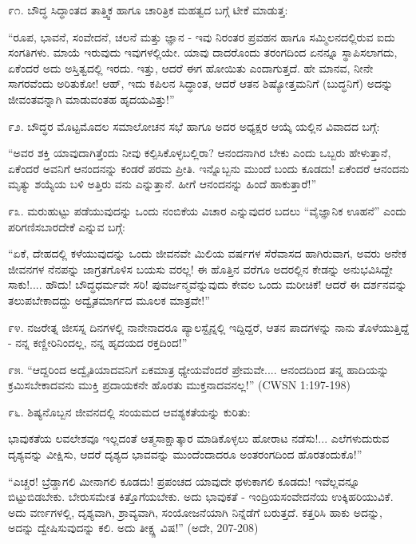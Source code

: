 ೯೧. ಬೌದ್ಧ ಸಿದ್ಧಾಂತದ ತಾತ್ತ್ವಿಕ ಹಾಗೂ ಚಾರಿತ್ರಿಕ ಮಹತ್ವದ ಬಗ್ಗೆ ಟೀಕೆ ಮಾಡುತ್ತ:

“ರೂಪ, ಭಾವನೆ, ಸಂವೇದನೆ, ಚಲನೆ ಮತ್ತು ಜ್ಞಾನ - ಇವು ನಿರಂತರ ಪ್ರವಹನ ಹಾಗೂ ಸಮ್ಮಿಲನದಲ್ಲಿರುವ ಐದು ಸಂಗತಿಗಳು. ಮಾಯೆ ಇರುವುದು ಇವುಗಳಲ್ಲಿಯೇ. ಯಾವು ದಾದರೊಂದು ತರಂಗದಿಂದ ಏನನ್ನೂ ಸ್ಥಾಪಿಸಲಾಗದು, ಏಕೆಂದರೆ ಅದು ಅಸ್ತಿತ್ವದಲ್ಲಿ ಇರದು. ಇತ್ತು, ಆದರೆ ಈಗ ಹೋಯಿತು ಎಂದಾಗುತ್ತದೆ. ಹೇ ಮಾನವ, ನೀನೇ ಸಾಗರವೆಂದು ಅರಿತುಕೋ! ಆಹ್, ಇದು ಕಪಿಲನ ಸಿದ್ಧಾಂತ, ಆದರೆ ಆತನ ಶಿಷ್ಯೋತ್ತಮನಿಗೆ (ಬುದ್ಧನಿಗೆ) ಅದನ್ನು ಜೀವಂತವನ್ನಾಗಿ ಮಾಡುವಂತಹ ಹೃದಯವಿತ್ತು!” 

೯೨. ಬೌದ್ಧರ ಮೊಟ್ಟಮೊದಲ ಸಮಾಲೋಚನ ಸಭೆ ಹಾಗೂ ಅದರ ಅಧ್ಯಕ್ಷರ ಆಯ್ಕೆ ಯಲ್ಲಿನ ವಿವಾದದ ಬಗ್ಗೆ:

“ಅವರ ಶಕ್ತಿ ಯಾವುದಾಗಿತ್ತೆಂದು ನೀವು ಕಲ್ಪಿಸಿಕೊಳ್ಳಬಲ್ಲಿರಾ? ಆನಂದನಾಗಿರ ಬೇಕು ಎಂದು ಒಬ್ಬರು ಹೇಳುತ್ತಾನೆ, ಏಕೆಂದರೆ ಅವನಿಗೆ ಆನಂದನನ್ನು ಕಂಡರೆ ಪರಮ ಪ್ರೀತಿ. ಇನ್ನೊಬ್ಬನು ಮುಂದೆ ಬಂದು ಕೂಡದು! ಏಕೆಂದರೆ ಆನಂದನು ಮೃತ್ಯು ಶಯ್ಯೆಯ ಬಳಿ ಅತ್ತಿರು ವನು ಎನ್ನುತ್ತಾನೆ. ಹೀಗೆ ಆನಂದನನ್ನು ಹಿಂದೆ ಹಾಕುತ್ತಾರೆ!” 

೯೩. ಮರುಹುಟ್ಟು ಪಡೆಯುವುದನ್ನು ಒಂದು ನಂಬಿಕೆಯ ವಿಚಾರ ಎನ್ನುವುದರ ಬದಲು “ವೈಜ್ಞಾನಿಕ ಊಹನೆ” ಎಂದು ಪರಿಗಣಿಸಬಾರದೇಕೆ ಎನ್ನುವ ಬಗ್ಗೆ:

“ಏಕೆ, ದೇಹದಲ್ಲಿ ಕಳೆಯುವುದನ್ನು ಒಂದು ಜೀವನವೇ ಮಿಲಿಯ ವರ್ಷಗಳ ಸೆರೆವಾಸದ ಹಾಗಿರುವಾಗ, ಅವರು ಅನೇಕ ಜೀವನಗಳ ನೆನಪನ್ನು ಜಾಗ್ರತಗೊಳಿಸ ಬಯಸು ವರಲ್ಲ! ಈ ಹೊತ್ತಿನ ವರೆಗೂ ಅದರಲ್ಲಿನ ಕೇಡನ್ನು ಅನುಭವಿಸಿದ್ದೇ ಸಾಕು!.... ಹೌದು! ಬೌದ್ಧಧರ್ಮವೇ ಸರಿ! ಪುವರ್ಜನ್ಮವೆನ್ನುವುದು ಕೇವಲ ಒಂದು ಮರೀಚಿಕೆ! ಆದರೆ ಈ ದರ್ಶನವನ್ನು ತಲುಪಬೇಕಾದದ್ದು ಅದ್ವೈತಮಾರ್ಗದ ಮೂಲಕ ಮಾತ್ರವೇ!” 

೯೪. ನಜರೇತ್ನ ಜೀಸಸ್ನ ದಿನಗಳಲ್ಲಿ ನಾನೇನಾದರೂ ಪ್ಯಾಲಸ್ಟೈನ್ನಲ್ಲಿ ಇದ್ದಿದ್ದರೆ, ಆತನ ಪಾದಗಳನ್ನು ನಾನು ತೊಳೆಯುತ್ತಿದ್ದೆ - ನನ್ನ ಕಣ್ಣೀರಿನಿಂದಲ್ಲ, ನನ್ನ ಹೃದಯದ ರಕ್ತದಿಂದ!” 

೯೫. “ಆದ್ದರಿಂದ ಅದ್ವೈತಿಯಾದವನಿಗೆ ಏಕಮಾತ್ರ ಧ್ಯೇಯವೆಂದರೆ ಪ್ರೇಮವೇ.... ಆನಂದದಿಂದ ತನ್ನ ಹಾದಿಯನ್ನು ಕ್ರಮಿಸಬೇಕಾದವನು ಮುಕ್ತಿ ಪ್ರದಾಯಕನೇ ಹೊರತು ಮುಕ್ತನಾದವನಲ್ಲ!” (CWSN 1:197-198)

೯೬. ಶಿಷ್ಯನೊಬ್ಬನ ಜೀವನದಲ್ಲಿ ಸಂಯಮದ ಆವಶ್ಯಕತೆಯನ್ನು ಕುರಿತು:

ಭಾವುಕತೆಯ ಲವಲೇಶವೂ ಇಲ್ಲದಂತೆ ಆತ್ಮಸಾಕ್ಷಾತ್ಕಾರ ಮಾಡಿಕೊಳ್ಳಲು ಹೋರಾಟ ನಡೆಸು!... ಎಲೆಗಳುದುರುವ ದೃಶ್ಯವನ್ನು ವೀಕ್ಷಿಸು, ಆದರೆ ದೃಶ್ಯದ ಭಾವವನ್ನು ಮುಂದೆಂದಾದರೂ ಅಂತರಂಗದಿಂದ ಹೊರತಂದುಕೊ!” 

“ಎಚ್ಚರ! ಬ್ರೆಡ್ಡಾಗಲಿ ಮೀನಾಗಲಿ ಕೂಡದು! ಪ್ರಪಂಚದ ಯಾವುದೇ ಥಳುಕಾಗಲಿ ಕೂಡದು! ಇವೆಲ್ಲವನ್ನೂ ಬಿಟ್ಟುಬಿಡಬೇಕು. ಬೇರುಸಮೇತ ಕಿತ್ತೊಗೆಯಬೇಕು. ಅದು ಭಾವುಕತೆ - ಇಂದ್ರಿಯಸಂವೇದನೆಯ ಉಕ್ಕಿಹರಿಯುವಿಕೆ. ಅದು ವರ್ಣಗಳಲ್ಲಿ, ದೃಶ್ಯವಾಗಿ, ಶ್ರಾವ್ಯವಾಗಿ, ಸಂಯೋಜನೆಯಾಗಿ ನಿನ್ನೆಡೆಗೆ ಬರುತ್ತದೆ. ಕತ್ತರಿಸಿ ಹಾಕು ಅದನ್ನು, ಅದನ್ನು ದ್ವೇಷಿಸುವುದನ್ನು ಕಲಿ. ಅದು ತೀಕ್ಷ್ಣ ವಿಷ!” (ಅದೇ, 207-208)

